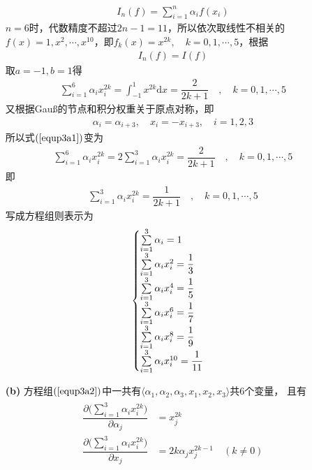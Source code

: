 \documentclass[12pt,a4paper,utf8]{ctexart}
\begin{document}
\begin{enumerate}
\begin{eqnarray}
      I_n(f)=\sum_{i=1}^n\alpha_if(x_i)
   \end{eqnarray}
   $n=6$时，代数精度不超过$2n-1=11$，所以依次取线性不相关的$f(x)=1,x^2,\cdots,x^{10}$，即$f_k(x)=x^{2k},\quad k=0,1,\cdots,5$，根据
   \begin{eqnarray}
      I_n(f)=I(f)
   \end{eqnarray}
   取$a=-1,b=1$得
   \begin{eqnarray}
      \sum_{i=1}^6\alpha_{i} x_i^{2k} =\int_{-1}^{1} x^{2k} \mathrm{d}x=\dfrac{2}{2k+1} \quad,\quad k=0,1,\cdots,5 \label{equp3a1}
   \end{eqnarray}
   又根据Gauß的节点和积分权重关于原点对称，即
   \begin{eqnarray}
      \alpha_{i}=\alpha_{i+3},\quad x_i=-x_{i+3},\quad i=1,2,3 \label{equp3a3}
   \end{eqnarray}
   所以式$(\ref{equp3a1})$变为
   \begin{eqnarray}
      \sum_{i=1}^6\alpha_{i} x_i^{2k} = 2\sum_{i=1}^{3}\alpha_{i} x_i^{2k} =\dfrac{2}{2k+1} \quad,\quad k=0,1,\cdots,5
   \end{eqnarray}
   即
   \begin{eqnarray}
      \sum_{i=1}^{3}\alpha_{i} x_i^{2k} =\dfrac{1}{2k+1} \quad,\quad k=0,1,\cdots,5
   \end{eqnarray}
   写成方程组则表示为
   \begin{eqnarray}
      \begin{cases}
             \sum\limits_{i=1}^{3}\alpha_{i} =1
         \cr \sum\limits_{i=1}^{3}\alpha_{i} x_i^{2} =\dfrac{1}{3}
         \cr \sum\limits_{i=1}^{3}\alpha_{i} x_i^{4} =\dfrac{1}{5}
         \cr \sum\limits_{i=1}^{3}\alpha_{i} x_i^{6} =\dfrac{1}{7}
         \cr \sum\limits_{i=1}^{3}\alpha_{i} x_i^{8} =\dfrac{1}{9}
         \cr \sum\limits_{i=1}^{3}\alpha_{i} x_i^{10} =\dfrac{1}{11}
         \end{cases} \label{equp3a2}
   \end{eqnarray}
   \item[\textbf{(b)}]方程组$(\ref{equp3a2})$中一共有$\langle \alpha_1,\alpha_2,\alpha_3,x_1,x_2,x_3\rangle$共$6$个变量，
   且有
   \begin{eqnarray}
      \begin{aligned}
      \dfrac{\partial \Big(\sum\limits_{i=1}^{3}\alpha_{i} x_i^{2k}\Big)}{\partial \alpha_j}&=x_j^{2k}\\
      \dfrac{\partial \Big(\sum\limits_{i=1}^{3}\alpha_{i} x_i^{2k}\Big)}{\partial x_j}&=2k\alpha_jx_j^{2k-1}\quad(k\neq 0)\\

\end{aligned}
\end{eqnarray}
\end{enumerate}
\end{document}
